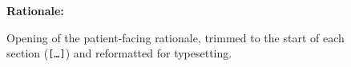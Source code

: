 \begin{figure}[htbp]
    \centering
    \footnotesize
    \begin{minipage}{0.92\linewidth}
        \textbf{Rationale:}\\[0.4em]
        
    \end{minipage}
    \caption[Plan rationale (trimmed).]{Opening of the patient-facing rationale, trimmed to the start of each section (\texttt{[\ldots]}) and reformatted for typesetting.}
    \label{fig:example-rationale}
\end{figure}
